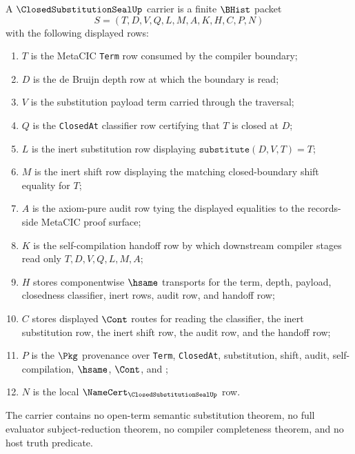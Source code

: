 \begin{definition}
\label{def:closed-term-substitution-seal-carrier}
A $\ClosedSubstitutionSealUp$ carrier is a finite $\BHist$ packet
$$
S=(T,D,V,Q,L,M,A,K,H,C,P,N)
$$
with the following displayed rows:
\begin{enumerate}
\item $T$ is the MetaCIC \texttt{Term} row consumed by the compiler boundary;
\item $D$ is the de Bruijn depth row at which the boundary is read;
\item $V$ is the substitution payload term carried through the traversal;
\item $Q$ is the \texttt{ClosedAt} classifier row certifying that $T$ is closed at $D$;
\item $L$ is the inert substitution row displaying $\texttt{substitute}(D,V,T)=T$;
\item $M$ is the inert shift row displaying the matching closed-boundary shift equality for $T$;
\item $A$ is the axiom-pure audit row tying the displayed equalities to the records-side MetaCIC proof surface;
\item $K$ is the self-compilation handoff row by which downstream compiler stages read only $T,D,V,Q,L,M,A$;
\item $H$ stores componentwise $\hsame$ transports for the term, depth, payload, closedness classifier, inert rows, audit row, and handoff row;
\item $C$ stores displayed $\Cont$ routes for reading the classifier, the inert substitution row, the inert shift row, the audit row, and the handoff row;
\item $P$ is the $\Pkg$ provenance over \texttt{Term}, \texttt{ClosedAt}, substitution, shift, audit, self-compilation, $\hsame$, $\Cont$, and \NameCert{};
\item $N$ is the local $\NameCert_{\ClosedSubstitutionSealUp}$ row.
\end{enumerate}
The carrier contains no open-term semantic substitution theorem, no full evaluator subject-reduction theorem, no compiler completeness theorem, and no host truth predicate.
\end{definition}

